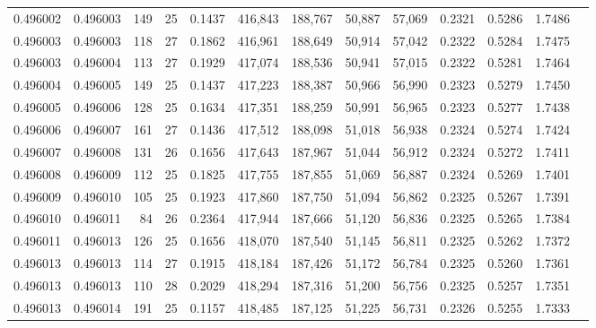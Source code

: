 \begin{tabular}{rrrrrrrrrrrrr}
0.496002 & 0.496003 & 149 &  25 &                                     0.1437 & 416,843 & 188,767 &  50,887 &  57,069 & 0.2321 & 0.5286 & 1.7486 \\
0.496003 & 0.496003 & 118 &  27 &                                     0.1862 & 416,961 & 188,649 &  50,914 &  57,042 & 0.2322 & 0.5284 & 1.7475 \\
0.496003 & 0.496004 & 113 &  27 &                                     0.1929 & 417,074 & 188,536 &  50,941 &  57,015 & 0.2322 & 0.5281 & 1.7464 \\
0.496004 & 0.496005 & 149 &  25 &                                     0.1437 & 417,223 & 188,387 &  50,966 &  56,990 & 0.2323 & 0.5279 & 1.7450 \\
0.496005 & 0.496006 & 128 &  25 &                                     0.1634 & 417,351 & 188,259 &  50,991 &  56,965 & 0.2323 & 0.5277 & 1.7438 \\
0.496006 & 0.496007 & 161 &  27 &                                     0.1436 & 417,512 & 188,098 &  51,018 &  56,938 & 0.2324 & 0.5274 & 1.7424 \\
0.496007 & 0.496008 & 131 &  26 &                                     0.1656 & 417,643 & 187,967 &  51,044 &  56,912 & 0.2324 & 0.5272 & 1.7411 \\
0.496008 & 0.496009 & 112 &  25 &                                     0.1825 & 417,755 & 187,855 &  51,069 &  56,887 & 0.2324 & 0.5269 & 1.7401 \\
0.496009 & 0.496010 & 105 &  25 &                                     0.1923 & 417,860 & 187,750 &  51,094 &  56,862 & 0.2325 & 0.5267 & 1.7391 \\
0.496010 & 0.496011 &  84 &  26 &                                     0.2364 & 417,944 & 187,666 &  51,120 &  56,836 & 0.2325 & 0.5265 & 1.7384 \\
0.496011 & 0.496013 & 126 &  25 &                                     0.1656 & 418,070 & 187,540 &  51,145 &  56,811 & 0.2325 & 0.5262 & 1.7372 \\
0.496013 & 0.496013 & 114 &  27 &                                     0.1915 & 418,184 & 187,426 &  51,172 &  56,784 & 0.2325 & 0.5260 & 1.7361 \\
0.496013 & 0.496013 & 110 &  28 &                                     0.2029 & 418,294 & 187,316 &  51,200 &  56,756 & 0.2325 & 0.5257 & 1.7351 \\
0.496013 & 0.496014 & 191 &  25 &                                     0.1157 & 418,485 & 187,125 &  51,225 &  56,731 & 0.2326 & 0.5255 & 1.7333 \\

\end{tabular}
